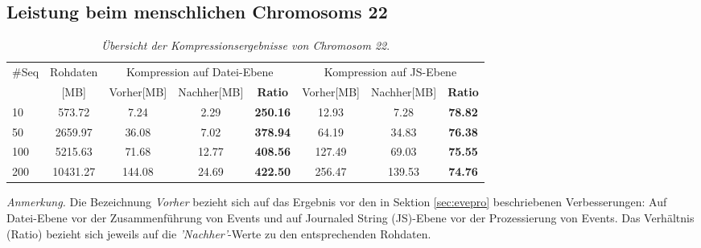 \documentclass[12pt]{article}
\newenvironment{tightcenter}{%
  \setlength\topsep{0pt}
  \setlength\parskip{0pt}
  \begin{center}
}{%
  \end{center}
}
\begin{document}
\subsection{Leistung beim menschlichen Chromosoms 22}
\begin{table}[t]
\caption{\label{tab:space}\emph{Übersicht der Kompressionsergebnisse von Chromosom 22}.}
\small
\begin{tightcenter}
\begin{tabular}{lccccccc}
	\toprule
	$\#$Seq & Rohdaten & \multicolumn{3}{c}{Kompression auf Datei-Ebene} & \multicolumn{3}{c}{Kompression auf JS-Ebene}\\
              &\tiny[MB] & Vorher\tiny[MB] & Nachher\tiny[MB] & \textbf{Ratio}       & Vorher\tiny[MB] & Nachher\tiny[MB] &  \textbf{Ratio}  \\
	\midrule
	10        &  573.72  &    7.24    &    2.29     &  \textbf{250.16}     &    12.93   &     7.28    &  \textbf{78.82}  \\
	50        & 2659.97  &   36.08    &    7.02     &  \textbf{378.94}     &    64.19   &     34.83   &  \textbf{76.38}  \\
	100       & 5215.63  &   71.68    &    12.77    &  \textbf{408.56}     &   127.49   &     69.03   &  \textbf{75.55}  \\
	200       & 10431.27 &  144.08    &    24.69    &  \textbf{422.50}     &   256.47   &    139.53   &  \textbf{74.76}  \\
	\bottomrule
\end{tabular}
\end{tightcenter}
\begin{tablenotes}
	\small
	\item \emph{Anmerkung.} Die Bezeichnung \textit{Vorher} bezieht sich auf das Ergebnis vor den in Sektion \ref{sec:evepro} beschriebenen Verbesserungen: Auf Datei-Ebene vor der Zusammenführung von Events und auf Journaled String (JS)-Ebene vor der Prozessierung von Events. Das Verhältnis (Ratio) bezieht sich jeweils auf die \textit{'Nachher'}-Werte zu den entsprechenden Rohdaten.
\end{tablenotes}
\end{table}
\end{document}
